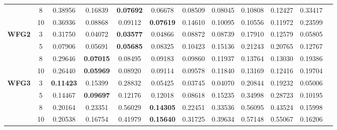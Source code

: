 \documentclass{sig-alternate}
\begin{document}
\begin{table}[!htb]
\begin{tabular}{|c|c|c|c|c|c|c|c|c|c|c|c|}
		& 8          & 0.38956          & 0.16839           & \textbf{0.07692}      & 0.06678          & 0.08509             & 0.08045             & 0.10808            & 0.12427              & 0.33417          \\ \cline{2-11} 
		& 10         & 0.36936          & 0.08868           & 0.09112               & \textbf{0.07619} & 0.14610             & 0.10095             & 0.10556            & 0.11972              & 0.23599          \\ \hline
		\multirow{4}{*}{\textbf{WFG2}}  & 3          & 0.31750          & 0.04072           & \textbf{0.03577}      & 0.04866          & 0.08872             & 0.08739             & 0.17910            & 0.12579              & 0.05805          \\ \cline{2-11} 
		& 5          & 0.07906          & 0.05691           & \textbf{0.05685}      & 0.08325          & 0.10423             & 0.15136             & 0.21243            & 0.20765              & 0.12767          \\ \cline{2-11} 
		& 8          & 0.29646          & \textbf{0.07015}  & 0.08495               & 0.09183          & 0.09860             & 0.11937             & 0.13764            & 0.13030              & 0.19386          \\ \cline{2-11} 
		& 10         & 0.26440          & \textbf{0.05969}  & 0.08920               & 0.09114          & 0.09578             & 0.11840             & 0.13169            & 0.12416              & 0.19704          \\ \hline
		\multirow{4}{*}{\textbf{WFG3}}  & 3          & \textbf{0.11423} & 0.15399           & 0.28832               & 0.05425          & 0.03745             & 0.04070             & 0.20844            & 0.19232              & 0.05006          \\ \cline{2-11} 
		& 5          & 0.14467          & \textbf{0.09697}  & 0.12176               & 0.12018          & 0.08618             & 0.15235             & 0.34998            & 0.28723              & 0.10195          \\ \cline{2-11} 
		& 8          & 0.20164          & 0.23351           & 0.56029               & \textbf{0.14305} & 0.22451             & 0.33536             & 0.56095            & 0.43524              & 0.15998          \\ \cline{2-11} 
		& 10         & 0.20538          & 0.16754           & 0.41979               & \textbf{0.15640} & 0.31725             & 0.39634             & 0.57148            & 0.55067              & 0.16206          \\ \hline

\end{tabular}
\end{table}
\end{document}
